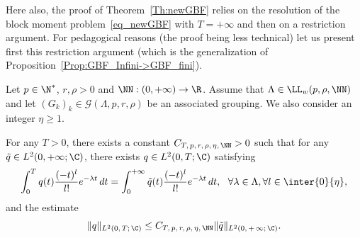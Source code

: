 Here also, the proof of Theorem~\ref{Th:newGBF} relies on the resolution of the block moment problem~\eqref{eq_newGBF} with $T=+\infty$ and then on a restriction argument. For pedagogical reasons (the proof being less technical) let us present first this restriction argument (which is the generalization of Proposition~\ref{Prop:GBF_Infini->GBF_fini}).

\begin{prop}\label{Prop:newGBF_Infini->GBF_fini}
Let $p \in \N^*$, $r, \rho > 0$ and $\NN : (0,+\infty) \to \R$. Assume that $\Lambda \in \LL_w(p,\rho, \NN)$ and let $(G_k)_k\in \mathcal{G}(\Lambda,p,r,\rho)$ be an associated grouping. We also consider an integer $\eta\geq 1$.

For any $T>0$, there exists a constant $C_{T,\, p,\, r,\, \rho,\, \eta,\, \NN} >0$ such that for any $\tilde{q}\in L^2(0,+\infty;\C)$, there exists $q\in L^2(0,T;\C)$ satisfying
\[
\int_0^{T} q(t) \frac{(-t)^l}{l!} e^{-\lambda t} \, dt = \int_0^{+\infty} \tilde{q}(t) \frac{(-t)^l}{l!} e^{-\lambda t} \, dt, \ \ \forall \lambda\in \Lambda, \forall l\in \inter{0}{\eta},
\]
and the estimate
\[
\|q\|_{L^2(0,\,T;\,\C)}\leq C_{T,\, p,\, r,\, \rho, \,\eta,\, \NN} \|\tilde{q}\|_{L^2(0,\,+\,\infty;\,\C)}.
\]
\end{prop}

